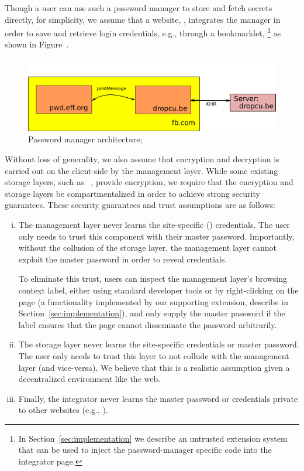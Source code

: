 %
Though a user can use such a password manager to store and fetch secrets
directly, for simplicity, we assume that a website, ,
integrates the manager in order to save and retrieve login
credentials, e.g., through a bookmarklet, \footnote{In Section~\ref{sec:implementation} we describe
an untrusted extension system that can be used to inject the
password-manager specific code into the integrator page.  
} as shown in Figure~.
%
\begin{figure}
\begin{center}
\includegraphics[scale=0.35]{pmanager.pdf}
\end{center}
\vspace{-10pt}
\caption{\label{fig:manager-s-1} Password manager
architecture;}
\vspace{-10pt}
\end{figure}
%
Without loss of generality, we also assume that encryption and
decryption is carried out on the client-side by the management layer.
%
While some existing storage layers, such as ~\tocite{},
provide encryption, we require that the encryption and storage layers
be compartmentalized in order to achieve strong security guarantees.
%
These security guarantees and trust assumptions are as follows:
\begin{enumerate}[i)]
\item The management layer never learns the site-specific ()
  credentials. The user only needs to trust this component with their master
  password. Importantly, without the collusion of the storage layer, the
  management layer cannot exploit the master password in order to reveal
  credentials.

  To eliminate this trust, users can inspect the management layer's
  browsing context label, either using standard developer tools or by
  right-clicking on the page (a functionality implemented by our
  supporting extension, describe in Section~\ref{sec:implementation}),
  and only supply the master password if the label ensures that the
  page cannot disseminate the password arbitrarily.

\item The storage layer never learns the site-specific credentials or
  master password. The user only needs to trust this layer to not
  collude with the management layer (and vice-versa). We believe that
  this is a realistic assumption given a decentralized environment
  like the web.

\item Finally, the integrator never learns the master password or
  credentials private to other websites (e.g., ).
\end{enumerate}
